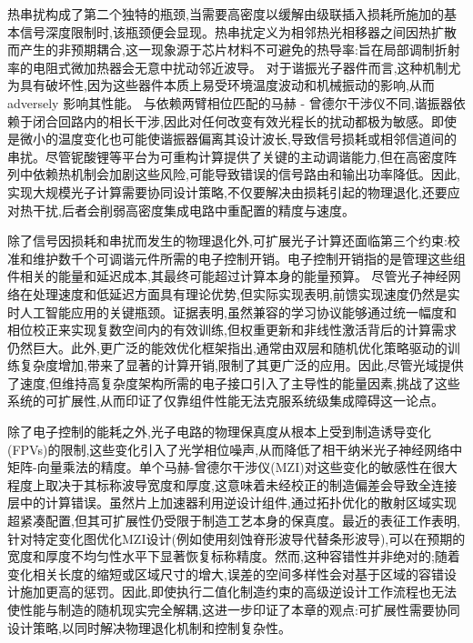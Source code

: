 热串扰构成了第二个独特的瓶颈,当需要高密度以缓解由级联插入损耗所施加的基本信号深度限制时,该瓶颈便会显现。热串扰定义为相邻热光相移器之间因热扩散而产生的非预期耦合,这一现象源于芯片材料不可避免的热导率:旨在局部调制折射率的电阻式微加热器会无意中扰动邻近波导。\citep{doi_10_1109_access_2020_3013116_8fec1fb2} 对于谐振光子器件而言,这种机制尤为具有破坏性,因为这些器件本质上易受环境温度波动和机械振动的影响,从而 adversely 影响其性能。\citep{doi_10_3390_photonics13030300_610aff5a} \citep{doi_10_1117_12_3079802_9c364d8e} 与依赖两臂相位匹配的马赫 - 曾德尔干涉仪不同,谐振器依赖于闭合回路内的相长干涉,因此对任何改变有效光程长的扰动都极为敏感。即使是微小的温度变化也可能使谐振器偏离其设计波长,导致信号损耗或相邻信道间的串扰。尽管铌酸锂等平台为可重构计算提供了关键的主动调谐能力,但在高密度阵列中依赖热机制会加剧这些风险,可能导致错误的信号路由和输出功率降低。因此,实现大规模光子计算需要协同设计策略,不仅要解决由损耗引起的物理退化,还要应对热干扰,后者会削弱高密度集成电路中重配置的精度与速度。\citep{doi_10_1109_access_2020_3013116_8fec1fb2} \citep{doi_10_3390_nano14080697_c372a140} \citep{doi_10_1126_science_abj4396_40f36a09}

除了信号因损耗和串扰而发生的物理退化外,可扩展光子计算还面临第三个约束:校准和维护数千个可调谐元件所需的电子控制开销。电子控制开销指的是管理这些组件相关的能量和延迟成本,其最终可能超过计算本身的能量预算。\citep{doi_10_1364_oe_26_010914_a68558fb} \citep{doi_10_1109_jphot_2026_3695696_63cd0e68} 尽管光子神经网络在处理速度和低延迟方面具有理论优势,但实际实现表明,前馈实现速度仍然是实时人工智能应用的关键瓶颈。证据表明,虽然兼容的学习协议能够通过统一幅度和相位校正来实现复数空间内的有效训练,但权重更新和非线性激活背后的计算需求仍然巨大。此外,更广泛的能效优化框架指出,通常由双层和随机优化策略驱动的训练复杂度增加,带来了显著的计算开销,限制了其更广泛的应用。因此,尽管光域提供了速度,但维持高复杂度架构所需的电子接口引入了主导性的能量因素,挑战了这些系统的可扩展性,从而印证了仅靠组件性能无法克服系统级集成障碍这一论点。\citep{doi_10_55041_ijsrem43509_b9a7bd5e} \citep{s2_b765388f3cc18d6e5a0507522822def0e3503ec6_fa09b483}

除了电子控制的能耗之外,光子电路的物理保真度从根本上受到制造诱导变化(FPVs)的限制,这些变化引入了光学相位噪声,从而降低了相干纳米光子神经网络中矩阵-向量乘法的精度。单个马赫-曾德尔干涉仪(MZI)对这些变化的敏感性在很大程度上取决于其标称波导宽度和厚度,这意味着未经校正的制造偏差会导致全连接层中的计算错误。虽然片上加速器利用逆设计组件,通过拓扑优化的散射区域实现超紧凑配置,但其可扩展性仍受限于制造工艺本身的保真度。最近的表征工作表明,针对特定变化图优化MZI设计(例如使用刻蚀脊形波导代替条形波导),可以在预期的宽度和厚度不均匀性水平下显著恢复标称精度。然而,这种容错性并非绝对的;随着变化相关长度的缩短或区域尺寸的增大,误差的空间多样性会对基于区域的容错设计施加更高的惩罚。因此,即使执行二值化制造约束的高级逆设计工作流程也无法使性能与制造的随机现实完全解耦,这进一步印证了本章的观点:可扩展性需要协同设计策略,以同时解决物理退化机制和控制复杂性。\citep{doi_10_1109_tnano_2022_3223915_d4da3e6b} \citep{doi_10_1038_s41467_026_68648_1_26658a9c}

